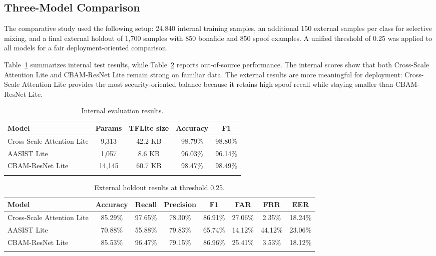 \documentclass[pdflatex,sn-mathphys-num]{sn-jnl}
\begin{document}
\subsection{Three-Model Comparison}

The comparative study used the following setup: 24{,}840 internal training samples, an additional 150 external samples per class for selective mixing, and a final external holdout of 1{,}700 samples with 850 bonafide and 850 spoof examples. A unified threshold of 0.25 was applied to all models for a fair deployment-oriented comparison.

Table~\ref{tab:internal} summarizes internal test results, while Table~\ref{tab:external} reports out-of-source performance. The internal scores show that both Cross-Scale Attention Lite and CBAM-ResNet Lite remain strong on familiar data. The external results are more meaningful for deployment: Cross-Scale Attention Lite provides the most security-oriented balance because it retains high spoof recall while staying smaller than CBAM-ResNet Lite.

\begin{table}[htbp]
\caption{Internal evaluation results.}
\label{tab:internal}
\centering
\small
\begin{tabular}{lcccc}
\toprule
\textbf{Model} & \textbf{Params} & \textbf{TFLite size} & \textbf{Accuracy} & \textbf{F1} \\
\midrule
Cross-Scale Attention Lite & 9{,}313 & 42.2 KB & 98.79\% & 98.80\% \\
AASIST Lite & 1{,}057 & 8.6 KB & 96.03\% & 96.14\% \\
CBAM-ResNet Lite & 14{,}145 & 60.7 KB & 98.47\% & 98.49\% \\
\botrule
\end{tabular}
\end{table}

\begin{table}[htbp]
\caption{External holdout results at threshold 0.25.}
\label{tab:external}
\centering
\small
\begin{tabular}{lccccccc}
\toprule
\textbf{Model} & \textbf{Accuracy} & \textbf{Recall} & \textbf{Precision} & \textbf{F1} & \textbf{FAR} & \textbf{FRR} & \textbf{EER} \\
\midrule
Cross-Scale Attention Lite & 85.29\% & 97.65\% & 78.30\% & 86.91\% & 27.06\% & 2.35\% & 18.24\% \\
AASIST Lite & 70.88\% & 55.88\% & 79.83\% & 65.74\% & 14.12\% & 44.12\% & 23.06\% \\
CBAM-ResNet Lite & 85.53\% & 96.47\% & 79.15\% & 86.96\% & 25.41\% & 3.53\% & 18.12\% \\
\botrule
\end{tabular}
\end{table}
\end{document}
